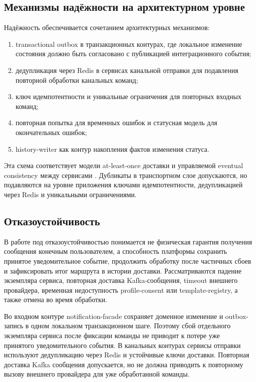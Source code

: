 \subsection{Механизмы надёжности на архитектурном уровне}

Надёжность обеспечивается сочетанием архитектурных механизмов:
\begin{enumerate}
    \item transactional outbox в транзакционных контурах, где локальное изменение состояния должно быть согласовано с публикацией интеграционного события;
    \item дедупликация через Redis в сервисах канальной отправки для подавления повторной обработки канальных команд;
    \item ключ идемпотентности и уникальные ограничения для повторных входных команд;
    \item повторная попытка для временных ошибок и статусная модель для окончательных ошибок;
    \item history-writer как контур накопления фактов изменения статуса.
\end{enumerate}

Эта схема соответствует модели at-least-once доставки и управляемой eventual consistency между сервисами \cite{kafka_docs,richardson_patterns}. Дубликаты в транспортном слое допускаются, но подавляются на уровне приложения ключами идемпотентности, дедупликацией через Redis и уникальными ограничениями.

\subsection{Отказоустойчивость}

В работе под отказоустойчивостью понимается не физическая гарантия получения сообщения конечным пользователем, а способность платформы сохранить принятое уведомительное событие, продолжить обработку после частичных сбоев и зафиксировать итог маршрута в истории доставки. Рассматриваются падение экземпляра сервиса, повторная доставка Kafka-сообщения, timeout внешнего провайдера, временная недоступность profile-consent или template-registry, а также отмена во время обработки.

Во входном контуре notification-facade сохраняет доменное изменение и outbox-запись в одном локальном транзакционном шаге. Поэтому сбой отдельного экземпляра сервиса после фиксации команды не приводит к потере уже принятого уведомительного события. В канальных контурах сервисы отправки используют дедупликацию через Redis и устойчивые ключи доставки. Повторная доставка Kafka сообщения допускается, но не должна приводить к повторному вызову внешнего провайдера для уже обработанной команды.

